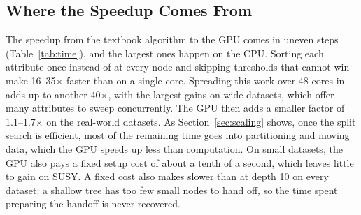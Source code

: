 \subsection{Where the Speedup Comes From}
\label{sec:time}

The speedup from the textbook algorithm to the GPU comes in uneven steps (Table~\ref{tab:time}), and the largest ones happen on the CPU. Sorting each attribute once instead of at every node and skipping thresholds that cannot win make \ImplSerialOpt{} 16--35$\times$ faster than \ImplSerialBase{} on a single core. Spreading this work over 48 cores in \ImplParallel{} adds up to another 40$\times$, with the largest gains on wide datasets, which offer many attributes to sweep concurrently. The GPU then adds a smaller factor of 1.1--1.7$\times$ on the real-world datasets. As Section~\ref{sec:scaling} shows, once the split search is efficient, most of the remaining time goes into partitioning and moving data, which the GPU speeds up less than computation. On small datasets, the GPU also pays a fixed setup cost of about a tenth of a second, which leaves little to gain on SUSY. A fixed cost also makes \ImplHybrid{} slower than \ImplGpu{} at depth 10 on every dataset: a shallow tree has too few small nodes to hand off, so the time spent preparing the handoff is never recovered.

